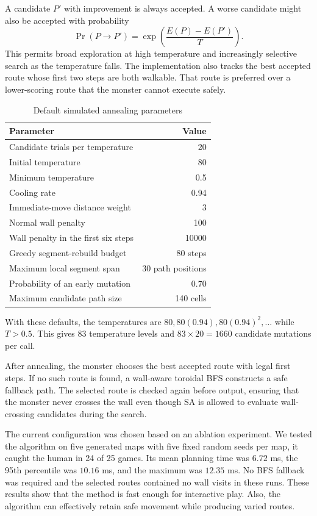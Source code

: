 \documentclass[12pt,a4paper]{article}
\begin{document}
A candidate $P'$ with improvement is always accepted. A worse candidate might also be
accepted with probability
\[
\Pr(P\rightarrow P')=
\exp\left(\frac{E(P)-E(P')}{T}\right).
\]
This permits broad exploration at high temperature and increasingly selective
search as the temperature falls. The implementation also tracks the best
accepted route whose first two steps are both walkable. That route
is preferred over a lower-scoring route that the monster cannot execute safely.

\begin{table}[H]
\centering
\caption{Default simulated annealing parameters}
\begin{tabular}{lr}
\toprule
Parameter & Value \\
\midrule
Candidate trials per temperature & 20 \\
Initial temperature & 80 \\
Minimum temperature & 0.5 \\
Cooling rate & 0.94 \\
Immediate-move distance weight & 3 \\
Normal wall penalty & 100 \\
Wall penalty in the first six steps & 10000 \\
Greedy segment-rebuild budget & 80 steps \\
Maximum local segment span & 30 path positions \\
Probability of an early mutation & 0.70 \\
Maximum candidate path size & 140 cells \\
\bottomrule
\end{tabular}
\end{table}

With these defaults, the temperatures are $80,80(0.94),80(0.94)^2,\ldots$
while $T>0.5$. This gives 83 temperature levels and $83\times20=1660$
candidate mutations per call. 

After annealing, the monster chooses the best accepted route with legal first
steps. If no such route is found, a wall-aware toroidal BFS constructs a safe
fallback path. The selected route is checked again before output, ensuring
that the monster never crosses the wall even though SA is
allowed to evaluate wall-crossing candidates during the search.

The current configuration was chosen based on an ablation experiment.
We tested the algorithm on five generated maps with five fixed random seeds per map,
it caught the human in 24 of 25 games. Its mean planning time was $6.72$ ms, the 95th
percentile was $10.16$ ms, and the maximum was $12.35$ ms. No BFS fallback
was required and the selected routes contained no wall visits in these runs.
These results show that the method is fast enough for interactive play.
Also, the algorithm can effectively retain safe movement while producing varied routes.
\end{document}
